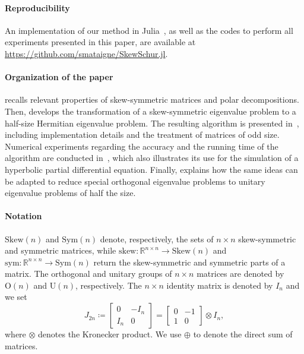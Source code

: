 \documentclass[final,onefignum,onetabnum,dvipsnames]{siamart251216}
\numberwithin{algorithm}{section}
\numberwithin{equation}{section}
\begin{document}
\paragraph{Reproducibility} An implementation of our method in Julia~\cite{Julia-2017}, as well as the codes to perform all experiments presented in this paper, are available at \url{https://github.com/smataigne/SkewSchur.jl}.

\paragraph{Organization of the paper}
 recalls relevant properties of skew-symmetric matrices and polar decompositions.
Then,  develops the transformation of a
skew-symmetric eigenvalue problem to a half-size Hermitian eigenvalue problem.
The resulting algorithm is presented in~, including implementation details and the treatment of matrices of odd size.
Numerical experiments regarding the accuracy and the running time of the algorithm are conducted in~, which also illustrates its use for the simulation of a hyperbolic partial differential equation.
Finally,  explains how the same ideas can be adapted to reduce special
orthogonal eigenvalue problems to unitary eigenvalue problems of half the size. 

\paragraph{Notation} $\mathrm{Skew}(n)$ and $\mathrm{Sym}(n)$ denote, respectively, the sets of $n\times n$ skew-symmetric and symmetric matrices, while $\mathrm{skew}:\mathbb{R}^{n\times n}\rightarrow \mathrm{Skew}(n)$ and $\mathrm{sym}:\mathbb{R}^{n\times n}\rightarrow \mathrm{Sym}(n)$ return the skew-symmetric and symmetric parts of a matrix.
The orthogonal and unitary groups of $n\times n$ matrices are denoted by $\mathrm{O}(n)$ and $\mathrm{U}(n)$, respectively. 
The $n\times n$ identity matrix is denoted by $I_n$ and we set
\begin{equation*}
    J_{2n} \coloneq \begin{bmatrix}
        0&-I_n\\
        I_n&0
    \end{bmatrix} = \begin{bmatrix}
        0&-1\\
        1&0
    \end{bmatrix}\otimes I_n,
\end{equation*}
where  $\otimes$ denotes the Kronecker product. We use $\oplus$ to denote the direct sum of matrices.
\end{document}
